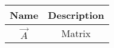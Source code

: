 \begin{tabular}{|c|c|}
\hline
\textbf{Name} & \textbf{Description} \\
\hline
$\vec{A}$ & Matrix \\
\hline
\end{tabular}
